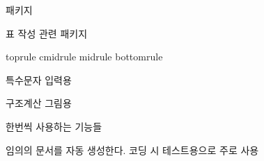 \documentclass[ aspectratio=149,  14pt,blue,xcolor=pdftex,dvipsnames,table,handout,notes]{beamer}
\begin{document}
		\begin{frame}[t]{패키지}


			\begin{block} {표 작성 관련 패키지}
			\begin{description}[12345678901234567890]
			\item[booktabs]	toprule cmidrule midrule bottomrule  
			\item[longtable]	
			\item[tabularx]	
			\item[array]		
			\item[bigstrut]	
			\end{description}
			\end{block}


			\begin{block} {특수문자 입력용}
			\begin{description}[12345678901234567890]
			\item[textcomp]
			\item[gensymb]
			\item[marvosym] 	 구조계산 그림용
			\end{description}
			\end{block}


			\begin{block} {한번씩 사용하는 기능들}
			\begin{description}[12345678901234567890]
			\item[blindtext] 임의의 문서를 자동 생성한다. 코딩 시 테스트용으로 주로 사용
			\end{description}
			\end{block}


		\end{frame}
\end{document}
